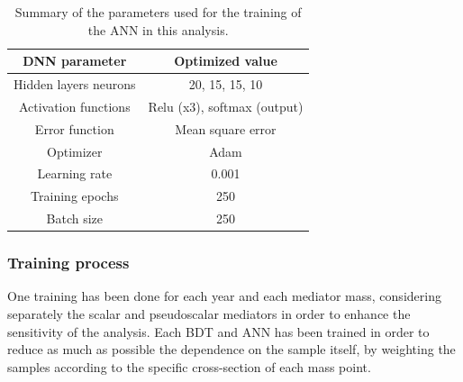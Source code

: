 \documentclass[a4paper, 10pt, openright]{report}
\begin{document}
\begin{table}
\begin{center}
\begin{tabular}{ c|c } 
\hline
 DNN parameter & Optimized value \\
 \hline
 Hidden layers neurons & 20, 15, 15, 10 \\
 Activation functions & Relu (x3), softmax (output) \\
Error function & Mean square error \\
Optimizer & Adam \\
Learning rate & 0.001 \\
Training epochs & 250 \\
Batch size & 250 \\
\hline
\end{tabular}
\caption{Summary of the parameters used for the training of the \ac{ANN} in this analysis.}
\label{table:DNN}
\end{center}
\end{table}


\subsubsection{Training process}

One training has been done for each year and each mediator mass, considering separately the scalar and pseudoscalar mediators in order to enhance the sensitivity of the analysis. Each \ac{BDT} and \ac{ANN} has been trained in order to reduce as much as possible the dependence on the sample itself, by weighting the samples according to the specific cross-section of each mass point.
\end{document}
